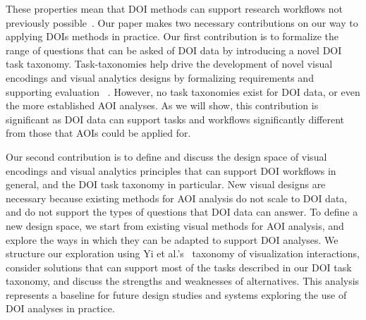 These properties mean that DOI methods can support research workflows not previously possible~\cite{alamdata, sundstedt2013visual, bernhard2014gaze}. Our paper makes two necessary contributions on our way to applying DOIs methods in practice. 
Our first contribution is to formalize the range of questions that can be asked of DOI data by introducing a novel DOI task taxonomy. Task-taxonomies help drive the development of novel visual encodings and visual analytics designs by formalizing requirements and supporting evaluation ~\cite{amar2005low,okoe2015graphunit}. However, no task taxonomies exist for DOI data, or even the more established AOI analyses. As we will show, this contribution is significant as DOI data can support tasks and workflows significantly different from those that AOIs could be applied for.

Our second contribution is to define and discuss the design space of visual encodings and visual analytics principles that can support DOI workflows in general, and the DOI task taxonomy in particular. New visual designs are necessary because existing methods for AOI analysis do not scale to DOI data, and do not support the types of questions that DOI data can answer. To define a new design space, we start from existing visual methods for AOI analysis, and explore the ways in which they can be adapted to support DOI analyses. We structure our exploration using Yi et al.'s~\cite{yi2007toward} taxonomy of visualization interactions, consider solutions that can support most of the tasks described in our DOI task taxonomy, and discuss the strengths and weaknesses of alternatives.  This analysis represents a baseline for future design studies and systems exploring the use of DOI analyses in practice.


